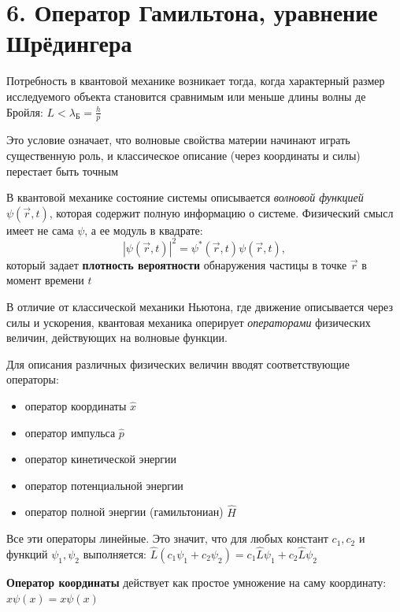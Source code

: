 \documentclass[12pt]{article}
\begin{document}





\section{6. Оператор Гамильтона, уравнение Шрёдингера}

Потребность в квантовой механике возникает тогда, когда характерный размер исследуемого объекта становится сравнимым или меньше длины волны де Бройля: $L < \lambda_{\text{Б}} = \frac{h}{p}$

Это условие означает, что волновые свойства материи начинают играть существенную роль, и классическое описание (через координаты и силы) перестает быть точным

\mediumvspace

В квантовой механике состояние системы описывается \textit{волновой функцией} $\psi(\vec r, t)$, которая содержит полную информацию о системе.  
Физический смысл имеет не сама $\psi$, а ее модуль в квадрате:
\[
|\psi(\vec r, t)|^2 = \psi^*(\vec r, t)\psi(\vec r, t),
\]
который задает \textbf{плотность вероятности} обнаружения частицы в точке $\vec r$ в момент времени $t$

\mediumvspace

В отличие от классической механики Ньютона, где движение описывается через силы и ускорения, квантовая механика оперирует \textit{операторами} физических величин, действующих на волновые функции.  

Для описания различных физических величин вводят соответствующие операторы:

\begin{itemize}
    \item оператор координаты $\hat{x}$
    \item оператор импульса $\hat{p}$
    \item оператор кинетической энергии
    \item оператор потенциальной энергии
    \item оператор полной энергии (гамильтониан) $\hat{H}$
\end{itemize}

Все эти операторы линейные. Это значит, что для любых констант $c_1, c_2$ и функций $\psi_1, \psi_2$ выполняется: $\hat{L}(c_1 \psi_1 + c_2 \psi_2) = c_1 \hat{L}\psi_1 + c_2 \hat{L}\psi_2$


\textbf{Оператор координаты} действует как простое умножение на саму координату: $\hat{x}\psi(x) = x\psi(x)$
\end{document}
